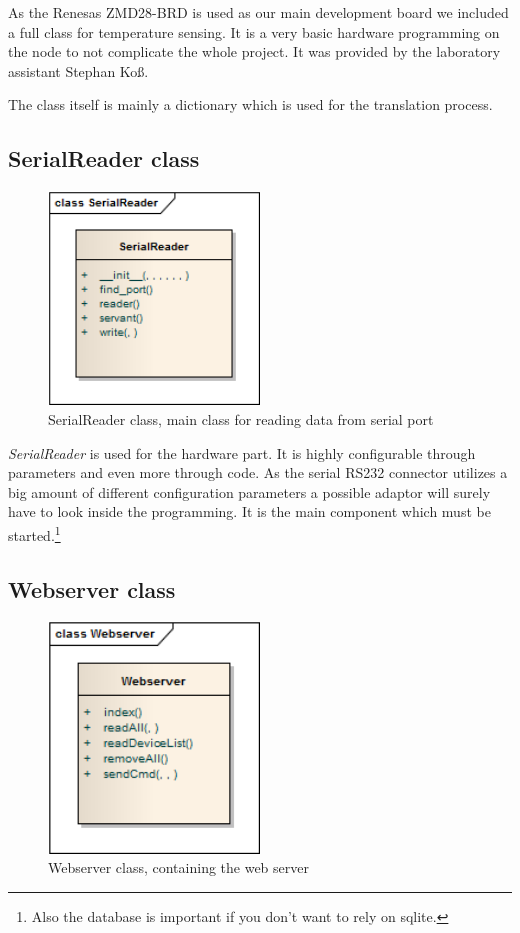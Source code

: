 As the Renesas ZMD28-BRD is used as our main development board we included a full class for temperature sensing. It is a very 
basic hardware programming on the node to not complicate the whole project. It was provided by the laboratory assistant Stephan Ko\ss.

The class itself is mainly a dictionary which is used for the translation process.

\newpage
\subsection{SerialReader class}
\begin{figure}[H]
   \centering
   \includegraphics[width=0.5\textwidth]{pic/SerialReader.png}%
   \caption{SerialReader class, main class for reading data from serial port}
   \label{SerialReaderpic}%
\end{figure}

\textit{SerialReader} is used for the hardware part. It is highly configurable through parameters and even more through code. As the
serial RS232 connector utilizes a big amount of different configuration parameters a possible adaptor will surely have to look inside the
programming. It is the main component which must be started.\footnote{Also the database is important if you don't want to rely on sqlite.}

\newpage
\subsection{Webserver class}
\begin{figure}[H]
   \centering
   \includegraphics[width=0.5\textwidth]{pic/Webserver.png}%
   \caption{Webserver class, containing the web server}
   \label{web serverpic}%
\end{figure}


